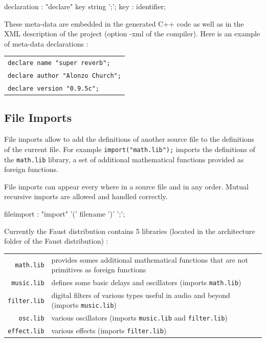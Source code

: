 \documentclass{article}
\begin{document}
\begin{rail}
declaration : "declare" key string ';';
key : identifier;
\end{rail}

These meta-data are embedded in the generated C++ code as well as in the XML description of the project (option -xml of the compiler). Here is an example of meta-data declarations :

\begin{tabular}{l}
	\texttt{declare name "super reverb";}\\
	\texttt{declare author "Alonzo Church";}\\
	\texttt{declare version "0.9.5c";}\\
\end{tabular}
 
\subsection{File Imports}

File imports allow to add the definitions of another source file to the definitions of the current file. 
For example \lstinline{import("math.lib");} imports the definitions of the \lstinline{math.lib} library, a set of additional mathematical functions provided as foreign functions.

File imports can appear every where in a source file and in any order. Mutual recursive imports are allowed and handled correctly.

\begin{rail}
fileimport : "import" '(' filename ')' ';'; 
\end{rail}

Currently the Faust distribution contains 5 libraries (located in the architecture folder of the Faust distribution) :
  
\begin{tabular}{|r|p{9cm}|} 
\hline
  \lstinline'math.lib'    & provides somes additional mathematical functions that are not primitives as foreign functions\\
  \lstinline'music.lib'   & defines some basic delays and oscillators (imports \lstinline'math.lib')\\
  \lstinline'filter.lib'  & digital filters of various types useful in audio and beyond (imports \lstinline'music.lib')\\
  \lstinline'osc.lib'   & various oscillators (imports \lstinline'music.lib' and \lstinline'filter.lib') \\
  \lstinline'effect.lib'   & various effects (imports \lstinline'filter.lib') \\
\hline
\end{tabular}
\end{document}
